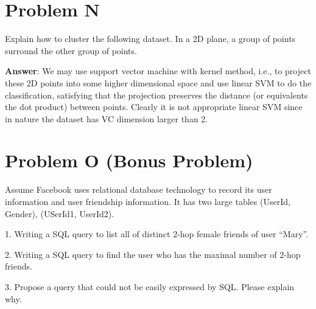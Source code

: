 \documentclass{article}
\begin{document}
\section{Problem N}
Explain how to cluster the following dataset. In a 2D plane, a group of points surround the other group of points.

{\bf Answer}:
We may use support vector machine with kernel method, i.e., to project these 2D points into some higher dimensional space and use linear SVM to do the classification, satisfying that the projection preserves the distance (or equivalents the dot product) between points. Clearly it is not appropriate linear SVM since in nature the dataset has VC dimension larger than 2.

\section{Problem O (Bonus Problem)}
Assume Facebook uses relational database technology to record its user information and user friendship information. It has two large tables (UserId, Gender), (USerId1, UserId2).

1. Writing a SQL query to list all of distinct 2-hop female friends of user ``Mary''.

2. Writing a SQL query to find the user who has the maximal number of 2-hop friends.

3. Propose a query that could not be easily expressed by SQL. Please explain why.
\end{document}
